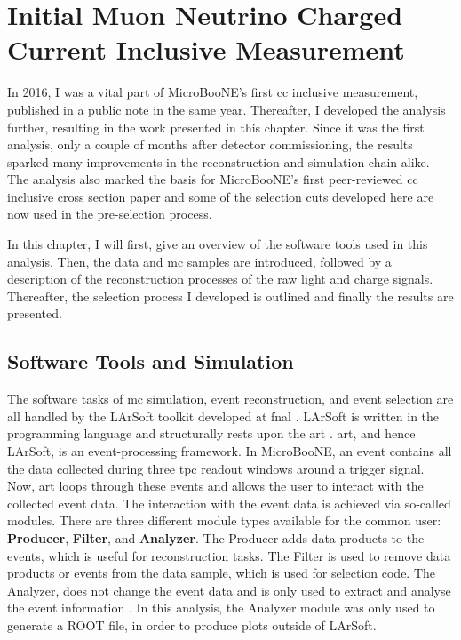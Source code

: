 \chapter{Initial Muon Neutrino Charged Current Inclusive Measurement} \label{sec:FistCCInclusive}
In 2016, I was a vital part of MicroBooNE's first \gls{cc} inclusive measurement, published in a public note \cite{MicroBooNECCInclPN} in the same year. Thereafter, I developed the analysis further, resulting in the work presented in this chapter. Since it was the first analysis, only a couple of months after detector commissioning, the results sparked many improvements in the reconstruction and simulation chain alike. The analysis also marked the basis for MicroBooNE's first peer-reviewed \gls{cc} inclusive cross section paper \cite{MicroBooNEFirstCCInclPublished} and some of the selection cuts developed here are now used in the pre-selection process.  

In this chapter, I will first, give an overview of the software tools used in this analysis. Then, the data and \gls{mc} samples are introduced, followed by a description of the reconstruction processes of the raw light and charge signals. Thereafter, the selection process I developed is outlined and finally the results are presented.

\section{Software Tools and Simulation} \label{sec:SoftwareTools}
The software tasks of \gls{mc} simulation, event reconstruction, and event selection are all handled by the \gls{LArSoft} toolkit developed at \gls{fnal} \cite{LArSoftWeb,LArSoft}. \Gls{LArSoft} is written in the \cpp programming language and structurally rests upon the \gls{art} \cite{ARTWeb,ART}. \Gls{art}, and hence \gls{LArSoft}, is an event-processing framework. In MicroBooNE, an event contains all the data collected during three \gls{tpc} readout windows around a trigger signal. Now, \gls{art} loops through these events and allows the user to interact with the collected event data. The interaction with the event data is achieved via so-called modules. There are three different module types available for the common user: \textbf{Producer}, \textbf{Filter}, and \textbf{Analyzer}. The Producer adds data products to the events, which is useful for \ia reconstruction tasks. The Filter is used to remove data products or events from the data sample, which is used \ia for selection code. The Analyzer, does not change the event data and is only used to extract and analyse the event information \cite{ART}. In this analysis, the Analyzer module was only used to generate a ROOT file, in order to produce plots outside of \gls{LArSoft}. 

